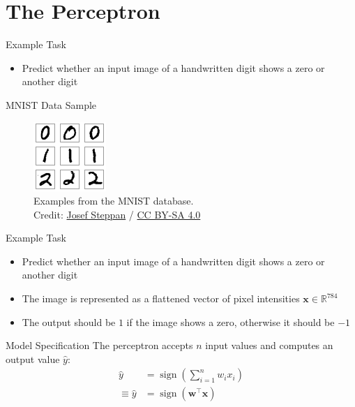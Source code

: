 \documentclass{beamer}
\DeclareMathOperator{\sign}{sign}
\begin{document}
	\section{The Perceptron}
	\begin{frame}{Example Task}
		\begin{itemize}
			\item<1-> Predict whether an input image of a handwritten digit shows a zero or another digit
		\end{itemize}
	\end{frame}
	\begin{frame}{MNIST Data Sample}
		\begin{figure}
			\includegraphics[scale=1.6]{img/mnist}
			\caption{Examples from the {MNIST} database. \\Credit: 
				\href{https://commons.wikimedia.org/wiki/File:MnistExamples.png}{Josef Steppan}
				/ \href{https://creativecommons.org/licenses/by-sa/4.0/deed.en}{CC BY-SA 4.0}}
		\end{figure}
	\end{frame}
	\begin{frame}{Example Task}
		\begin{itemize}
			\item <1-> Predict whether an input image of a handwritten digit shows a zero or another digit
			\item <2-> The image is represented as a flattened vector of pixel intensities $\bm{x} \in \mathbb{R}^{784}$
			\item <3-> The output should be $1$ if the image shows a zero, otherwise it should be $-1$
		\end{itemize}
	\end{frame}
	\begin{frame}{Model Specification}
		The perceptron accepts $n$ input values and computes an output value $\hat{y}$:
		\begin{equation}
			\begin{split}
			\hat{y} &= \sign\left (\sum_{i=1}^{n} w_ix_i\right )\\
			\equiv \hat{y} &= \sign(\bm{w}^\top\bm{x})
			\end{split}
		\end{equation}
	\end{frame}
	
\end{document}
